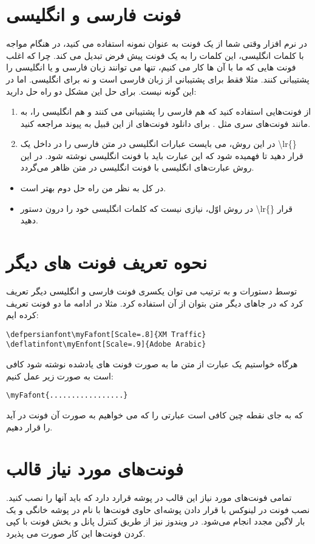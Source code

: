 \section{فونت فارسی و انگلیسی}
در نرم افزار  وقتی شما از یک فونت به عنوان نمونه  استفاده می کنید،  در هنگام مواجه با کلمات انگلیسی، این کلمات را به یک فونت پیش فرض تبدیل می کند. چرا که اغلب فونت هایی که ما با آن ها کار می کنیم، تنها می توانند زبان فارسی و یا انگلیسی را پشتیبانی کنند. مثلا  فقط برای پشتیبانی از زبان فارسی است و نه برای انگلیسی. اما در  این گونه نیست. برای حل این مشکل دو راه حل دارید:
\begin{enumerate}
 \item     از فونت‌هایی استفاده کنید که هم فارسی را پشتیبانی می کنند و هم انگلیسی را، به مانند فونت‌های سری  مثل . برای دانلود فونت‌های از این قبیل به پیوند  مراجعه کنید.
  \item     در این روش، می بایست عبارات انگلیسی در متن فارسی را در داخل یک \textbackslash{lr}\{\} قرار دهید تا فهمیده شود که این عبارت باید با فونت انگلیسی نوشته شود. در این روش عبارت‌های انگلیسی با فونت انگلیسی در متن ظاهر می‌گردد.
\end{enumerate}
\begin{itemize}
 \item     در کل به نظر من راه حل دوم بهتر است.
  \item  در روش اوّل، نیازی نیست که کلمات انگلیسی خود را درون دستور \textbackslash{lr}\{\} قرار دهید.
\end{itemize}
\section{نحوه تعریف فونت های دیگر}
توسط دستورات 
 و  به ترتیب می توان یکسری فونت فارسی و انگلیسی دیگر تعریف کرد که در جاهای دیگر متن بتوان از آن استفاده کرد. مثلا در ادامه ما دو فونت تعریف کرده ایم:
\begin{latin}
\begin{lstlisting}[style=Tex]
\defpersianfont\myFafont[Scale=.8]{XM Traffic}
\deflatinfont\myEnfont[Scale=.9]{Adobe Arabic}
\end{lstlisting}
\end{latin}
هرگاه خواستیم یک عبارت از متن ما به صورت فونت های یادشده نوشته شود کافی است به صورت زیر عمل کنیم:
\begin{latin}
\begin{lstlisting}[style=Tex]
\myFafont{.................}
\end{lstlisting}
\end{latin}
که به جای نقطه چین کافی است عبارتی را که می خواهیم به صورت آن فونت در آید را قرار دهیم. 
\section{فونت‌های مورد نیاز قالب }
تمامی فونت‌های مورد نیاز این قالب در پوشه  قرارد دارد که باید آنها را نصب کنید. نصب فونت در لینوکس با قرار دادن پوشه‌ای حاوی فونت‌ها با نام  در پوشه خانگی و یک بار لاگین مجدد انجام می‌شود. در ویندوز نیز از طریق کنترل پانل و بخش فونت با کپی کردن فونت‌ها این کار صورت می پذیرد.
